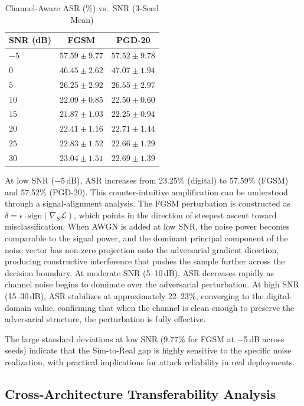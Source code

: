 \documentclass[conference]{IEEEtran}
\begin{document}
\begin{table}[t]
\centering
\caption{Channel-Aware ASR (\%) vs.\ SNR (3-Seed Mean)}\label{tab:channel_aware}
\begin{tabular}{lcc}
\toprule
\textbf{SNR (dB)} & \textbf{FGSM} & \textbf{PGD-20} \\
\midrule
$-5$ & $57.59 \pm 9.77$ & $57.52 \pm 9.78$ \\
$0$  & $46.45 \pm 2.62$ & $47.07 \pm 1.94$ \\
$5$  & $26.25 \pm 2.92$ & $26.55 \pm 2.97$ \\
$10$ & $22.09 \pm 0.85$ & $22.50 \pm 0.60$ \\
$15$ & $21.87 \pm 1.03$ & $22.25 \pm 0.94$ \\
$20$ & $22.41 \pm 1.16$ & $22.71 \pm 1.44$ \\
$25$ & $22.83 \pm 1.52$ & $22.66 \pm 1.29$ \\
$30$ & $23.04 \pm 1.51$ & $22.69 \pm 1.39$ \\
\bottomrule
\end{tabular}
\end{table}

At low SNR ($-$5\,dB), ASR increases from 23.25\% (digital) to 57.59\% (FGSM) and 57.52\% (PGD-20). This counter-intuitive amplification can be understood through a signal-alignment analysis. The FGSM perturbation is constructed as $\delta = \epsilon \cdot \text{sign}(\nabla_{S} \mathcal{L})$, which points in the direction of steepest ascent toward misclassification. When AWGN is added at low SNR, the noise power becomes comparable to the signal power, and the dominant principal component of the noise vector has non-zero projection onto the adversarial gradient direction, producing constructive interference that pushes the sample further across the decision boundary. At moderate SNR (5--10\,dB), ASR decreases rapidly as channel noise begins to dominate over the adversarial perturbation. At high SNR (15--30\,dB), ASR stabilizes at approximately 22--23\%, converging to the digital-domain value, confirming that when the channel is clean enough to preserve the adversarial structure, the perturbation is fully effective.

The large standard deviations at low SNR (9.77\% for FGSM at $-$5\,dB across seeds) indicate that the Sim-to-Real gap is highly sensitive to the specific noise realization, with practical implications for attack reliability in real deployments.

\subsection{Cross-Architecture Transferability Analysis}
\end{document}
